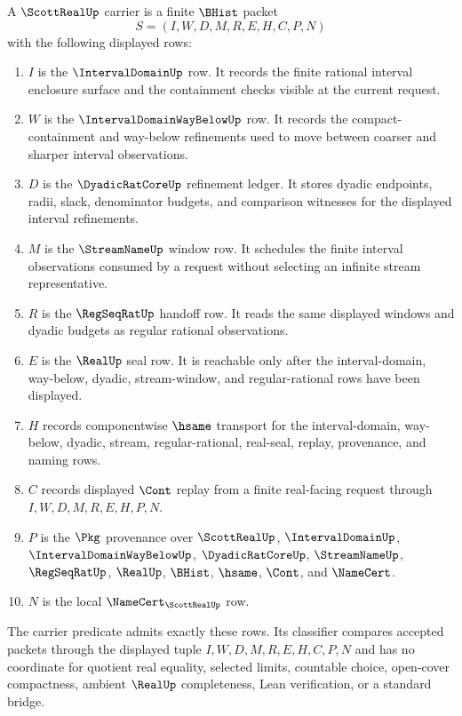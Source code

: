 \begin{definition}
\label{def:scott-real-carrier}
A $\ScottRealUp$ carrier is a finite $\BHist$ packet
$$
S=(I,W,D,M,R,E,H,C,P,N)
$$
with the following displayed rows:
\begin{enumerate}
\item $I$ is the $\IntervalDomainUp$ row. It records the finite rational interval enclosure surface and the containment checks visible at the current request.
\item $W$ is the $\IntervalDomainWayBelowUp$ row. It records the compact-containment and way-below refinements used to move between coarser and sharper interval observations.
\item $D$ is the $\DyadicRatCoreUp$ refinement ledger. It stores dyadic endpoints, radii, slack, denominator budgets, and comparison witnesses for the displayed interval refinements.
\item $M$ is the $\StreamNameUp$ window row. It schedules the finite interval observations consumed by a request without selecting an infinite stream representative.
\item $R$ is the $\RegSeqRatUp$ handoff row. It reads the same displayed windows and dyadic budgets as regular rational observations.
\item $E$ is the $\RealUp$ seal row. It is reachable only after the interval-domain, way-below, dyadic, stream-window, and regular-rational rows have been displayed.
\item $H$ records componentwise $\hsame$ transport for the interval-domain, way-below, dyadic, stream, regular-rational, real-seal, replay, provenance, and naming rows.
\item $C$ records displayed $\Cont$ replay from a finite real-facing request through $I,W,D,M,R,E,H,P,N$.
\item $P$ is the $\Pkg$ provenance over $\ScottRealUp$, $\IntervalDomainUp$, $\IntervalDomainWayBelowUp$, $\DyadicRatCoreUp$, $\StreamNameUp$, $\RegSeqRatUp$, $\RealUp$, $\BHist$, $\hsame$, $\Cont$, and $\NameCert$.
\item $N$ is the local $\NameCert_{\ScottRealUp}$ row.
\end{enumerate}
The carrier predicate admits exactly these rows. Its classifier compares accepted packets through the displayed tuple $I,W,D,M,R,E,H,C,P,N$ and has no coordinate for quotient real equality, selected limits, countable choice, open-cover compactness, ambient $\RealUp$ completeness, Lean verification, or a standard bridge.
\end{definition}

